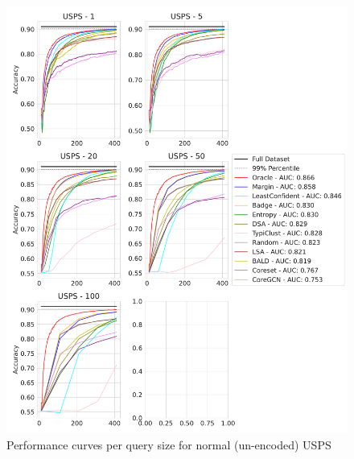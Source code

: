 \documentclass[]{article}
\begin{document}
\begin{figure}[H]
	\centering
	\caption{Performance curves per query size for normal (un-encoded) USPS}
	\includegraphics[width=\linewidth]{img/eval_usps}
\end{figure}
\end{document}
